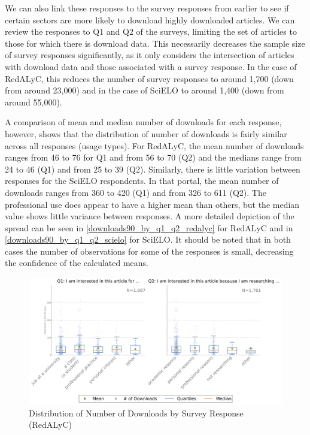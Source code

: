 We can also link these responses to the survey responses from earlier to see if certain sectors are more likely to download highly downloaded articles. We can review the responses to Q1 and Q2 of the surveys, limiting the set of articles to those for which there is download data. This necessarily decreases the sample size of survey responses significantly, as it only considers the intersection of articles with download data and those associated with a survey response. In the case of RedALyC, this reduces the number of survey responses to around 1,700 (down from around 23,000) and in the case of SciELO to around 1,400 (down from around 55,000).

A comparison of mean and median number of downloads for each response, however, shows that the distribution of number of downloads is fairly similar across all responses (usage types). For RedALyC, the mean number of downloads ranges from 46 to 76 for Q1 and from 56 to 70 (Q2) and the medians range from 24 to 46 (Q1) and from 25 to 39 (Q2). Similarly, there is little variation between responses for the SciELO respondents. In that portal, the mean number of downloads ranges from 360 to 420 (Q1) and from 326 to 611 (Q2). The professional use does appear to have a higher mean than others, but the median value shows little variance between responses. A more detailed depiction of the spread can be seen in \autoref{downloads90_by_q1_q2_redalyc} for RedALyC and in \autoref{downloads90_by_q1_q2_scielo} for SciELO. It should be noted that in both cases the number of observations for some of the responses is small, decreasing the confidence of the calculated means.

\begin{figure}[htbp]
\centering
\includegraphics[keepaspectratio,width=\textwidth,height=0.75\textheight]{figures/downloads90_by_q1_q2_redalyc.png}
\caption{Distribution of Number of Downloads by Survey Response (RedALyC)}
\label{downloads90_by_q1_q2_redalyc}
\end{figure}

